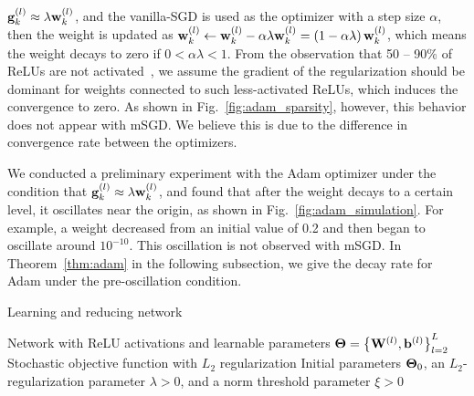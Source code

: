 \documentclass[conference]{IEEEtran}
\newcommand{\relmiddle}[1]{\mathrel{}\middle#1\mathrel{}}
\begin{document}
${\bf g}_k^{\left( l \right) } \approx \lambda {\bf w}_k^{\left( l \right)}$, and
the vanilla-SGD is used as the optimizer with a step size $\alpha$, then the weight is updated as ${\bf w}_k^{\left( l \right)} \gets {\bf w}_k^{\left( l \right)} - \alpha \lambda {\bf w}_k^{\left( l \right)} = \left ( 1 - \alpha \lambda \right ) {\bf w}_k^{\left( l \right)}$, 
which means the weight decays to zero if $0 < \alpha \lambda < 1$.
From the observation that 50 -- 90\% of ReLUs are not activated~\cite{Glorot_2011}\cite{Shi_2017}, 
we assume the gradient of the regularization should be dominant for weights connected to such less-activated ReLUs, which induces the convergence to zero.
As shown in Fig.~\ref{fig:adam_sparsity}, however, this behavior does not appear with mSGD.
We believe this is due to the difference in convergence rate between the optimizers.

We conducted a preliminary experiment with the Adam optimizer under the condition that ${\bf g}_k^{\left( l \right) } \approx \lambda {\bf w}_k^{\left( l \right)}$, 
and found that after the weight decays to a certain level, it oscillates near the origin, as shown in Fig.~\ref{fig:adam_simulation}.
For example, a weight decreased from an initial value of 0.2 and then began to oscillate around $10^{-10}$. 
This oscillation is not observed with mSGD.
In Theorem~\ref{thm:adam} in the following subsection, we give the decay rate for Adam under the pre-oscillation condition.

\begin{algorithm}[tb]
	\caption{Learning and reducing network}
	\label{alg:learning}
	\begin{algorithmic}[1]
	\REQUIRE Network with ReLU activations and learnable parameters ${\bf \Theta} = \left \{ {\bf W}^{\left( l \right)}, {\bf b}^{\left( l \right)} \right \}_{l=2}^L$
	\REQUIRE Stochastic objective function with $L_2$ regularization
	\REQUIRE Initial parameters ${\bf \Theta}_0$, an $L_2$-regularization parameter $\lambda > 0$, and a norm threshold parameter $\xi > 0$
		\ENDWHILE
			\STATE{Eliminate $ \left \{ {\bf w}_k^{\left( l \right)} \relmiddle| \Vert {\bf w}_k^{\left( l \right)} \Vert_2 < \xi,\ k = 1, \dots, C^{\left( l \right)} \right \} $ \\ from ${\bf \Theta}_t$}
		\ENDFOR
	\end{algorithmic}
\end{algorithm}
\end{document}
